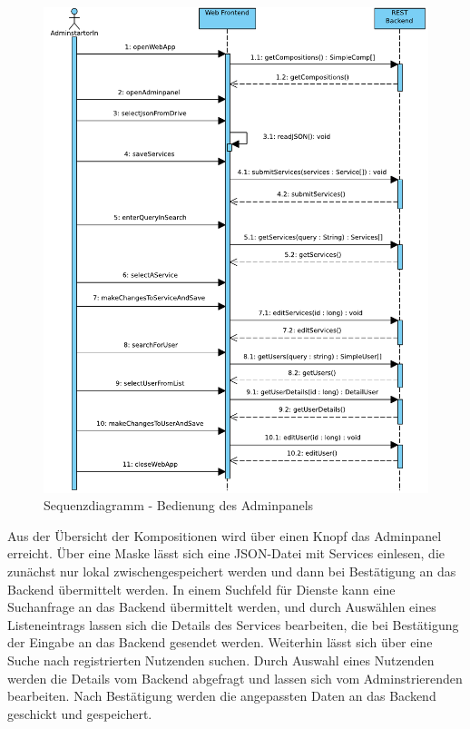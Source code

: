 \begin{figure}[!h]
	\centering
	\includegraphics[width=.5\textwidth]{img/Diagramme/Sequenz/Frontend_admin}			
	\caption{Sequenzdiagramm - Bedienung des Adminpanels}
	\label{fig:sequenz-adminPanel}
\end{figure}
\noindent
Aus der Übersicht der Kompositionen wird über einen Knopf das Adminpanel erreicht. Über eine Maske lässt sich eine JSON-Datei mit Services einlesen, die zunächst nur lokal zwischengespeichert werden und dann bei Bestätigung an das Backend übermittelt werden. In einem Suchfeld für Dienste kann eine Suchanfrage an das Backend übermittelt werden, und durch Auswählen eines Listeneintrags lassen sich die Details des Services bearbeiten, die bei Bestätigung der Eingabe an das Backend gesendet werden. Weiterhin lässt sich über eine Suche nach registrierten Nutzenden suchen. Durch Auswahl eines Nutzenden werden die Details vom Backend abgefragt und lassen sich vom Adminstrierenden bearbeiten. Nach Bestätigung werden die angepassten Daten an das Backend geschickt und gespeichert.

